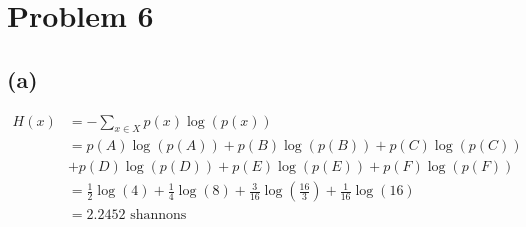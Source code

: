 \section*{Problem 6}
\subsection*{(a)}
\begin{align*}
	H(x)&=-\sum_{x\in X} p(x)\log(p(x))\\
	&=p(A)\log(p(A))+p(B)\log(p(B))+p(C)\log(p(C))\\&+p(D)\log(p(D))+p(E)\log(p(E))+p(F)\log(p(F))\\
	&=\frac{1}{2}\log(4)+\frac{1}{4}\log(8)+\frac{3}{16}\log(\frac{16}{3})+\frac{1}{16}\log(16)\\
	&=\boxed{2.2452\text{ shannons}}
\end{align*}

